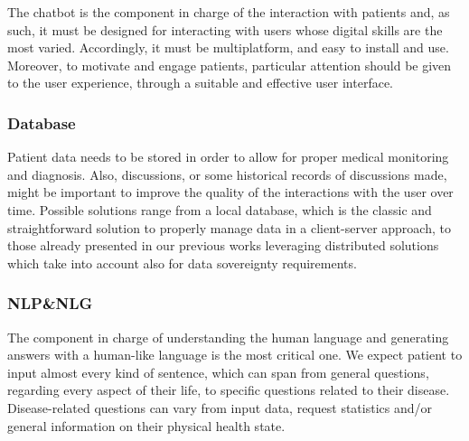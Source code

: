 The chatbot is the component in charge of the interaction with patients and, as such, it must be designed for interacting with users whose digital skills are the most varied. Accordingly, it must be multiplatform, and easy to install and use.
%
Moreover, to motivate and engage patients, particular attention should be given to the user experience, through a suitable and effective user interface.

\subsubsection{Database}
Patient data needs to be stored in order to allow for proper medical monitoring and diagnosis. 
Also, discussions, or some historical records of discussions made, might be important to improve the quality of the interactions with the user over time. 
Possible solutions range from a local database, which is the classic and straightforward solution to properly manage data in a client-server approach, to those already presented in our previous works \cite{MontagnaGoodIT2023} leveraging distributed solutions which take into account also for data sovereignty requirements.

\subsubsection{NLP\&NLG}\label{subsubsec-nlp}

The component in charge of understanding the human language and generating answers with a human-like language is the most critical one.
%
We expect patient to input almost every kind of sentence, which can span from general questions, regarding every aspect of their life, to specific questions related to their disease. 
%
Disease-related questions can vary from input data, request statistics and/or general information on their physical health state.

